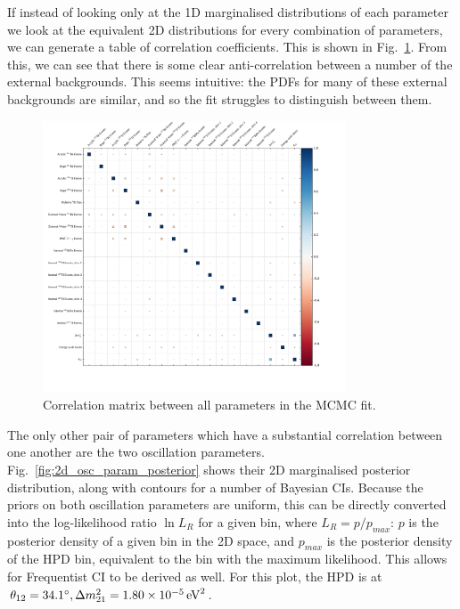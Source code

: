 If instead of looking only at the 1D marginalised distributions of each parameter we look at the equivalent 2D distributions for every combination of parameters, we can generate a table of correlation coefficients. This is shown in Fig.~\ref{fig:corr_plots_params}. From this, we can see that there is some clear anti-correlation between a number of the external backgrounds. This seems intuitive: the PDFs for many of these external backgrounds are similar, and so the fit struggles to distinguish between them.

\begin{figure}
    \centering
    \includegraphics[width=0.8\textwidth]{6_SolarAnalysis/images/corr_coeff.pdf}
    \caption[Correlation matrix between all parameters in the MCMC fit]
    {Correlation matrix between all parameters in the MCMC fit.}
    \label{fig:corr_plots_params}
\end{figure}

The only other pair of parameters which have a substantial correlation between one another are the two oscillation parameters. Fig.~\ref{fig:2d_osc_param_posterior} shows their 2D marginalised posterior distribution, along with contours for a number of Bayesian CIs. Because the priors on both oscillation parameters are uniform, this can be directly converted into the log-likelihood ratio $\ln{L_{R}}$ for a given bin, where $L_{R} = p/p_{max}$: $p$ is the posterior density of a given bin in the 2D space, and $p_{max}$ is the posterior density of the HPD bin, equivalent to the bin with the maximum likelihood. This allows for Frequentist CI to be derived as well. For this plot, the HPD is at $\tonetwo{} = \ang{34.1}, \dmsq{} = \SI{1.80e-5}{\eV\squared}$.

